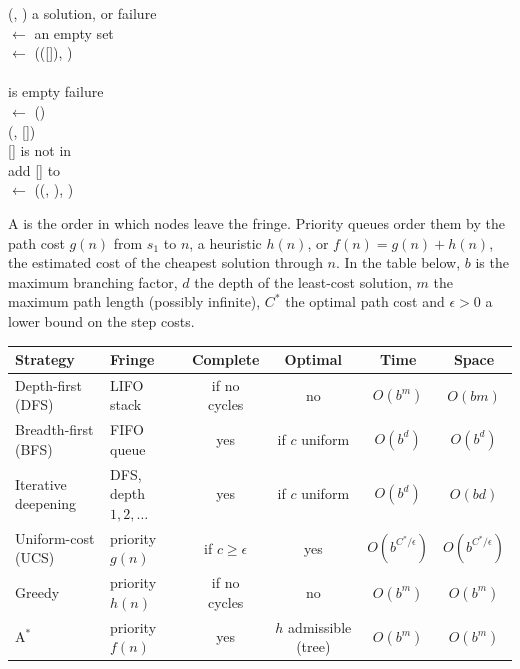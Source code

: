 \documentclass[11pt, a4paper]{exam}
\newcommand{\Astar}{$\text{A}^*$}
\begin{document}
\begin{recap}
    \begin{pseudocode}
         (, )  a solution, or failure \\
        \>  $\gets$ an empty set \\
        \>  $\gets$ (([]), ) \\
        \>  \\
        \> \>   is empty  failure \\
        \> \>  $\gets$ () \\
        \> \>  (, [])   \\
        \> \>  [] is not in   \\
        \> \> \> add [] to  \\
        \> \> \>  $\gets$ ((, ), ) \\
        \> 
    \end{pseudocode}

    A  is the order in which nodes leave the fringe. Priority queues order them by the path cost $g(n)$ from $s_1$ to $n$, a heuristic $h(n)$, or $f(n) = g(n) + h(n)$, the estimated cost of the cheapest solution through $n$. In the table below, $b$ is the maximum branching factor, $d$ the depth of the least-cost solution, $m$ the maximum path length (possibly infinite), $C^*$ the optimal path cost and $\epsilon > 0$ a lower bound on the step costs.

    \begin{center}
        \small
        \begin{tabular}{llcccc}
            \toprule
            Strategy & Fringe & Complete & Optimal & Time & Space \\
            \midrule
            Depth-first (DFS) & LIFO stack & if no cycles & no & $O(b^m)$ & $O(bm)$ \\
            Breadth-first (BFS) & FIFO queue & yes & if $c$ uniform & $O(b^d)$ & $O(b^d)$ \\
            Iterative deepening & DFS, depth $1, 2, \ldots$ & yes & if $c$ uniform & $O(b^d)$ & $O(bd)$ \\
            Uniform-cost (UCS) & priority $g(n)$ & if $c \geq \epsilon$ & yes & $O(b^{C^*/\epsilon})$ & $O(b^{C^*/\epsilon})$ \\
            Greedy & priority $h(n)$ & if no cycles & no & $O(b^m)$ & $O(b^m)$ \\
            \Astar{} & priority $f(n)$ & yes & $h$ admissible (tree) & $O(b^m)$ & $O(b^m)$ \\
            \bottomrule
        \end{tabular}
    \end{center}


\end{recap}
\end{document}

